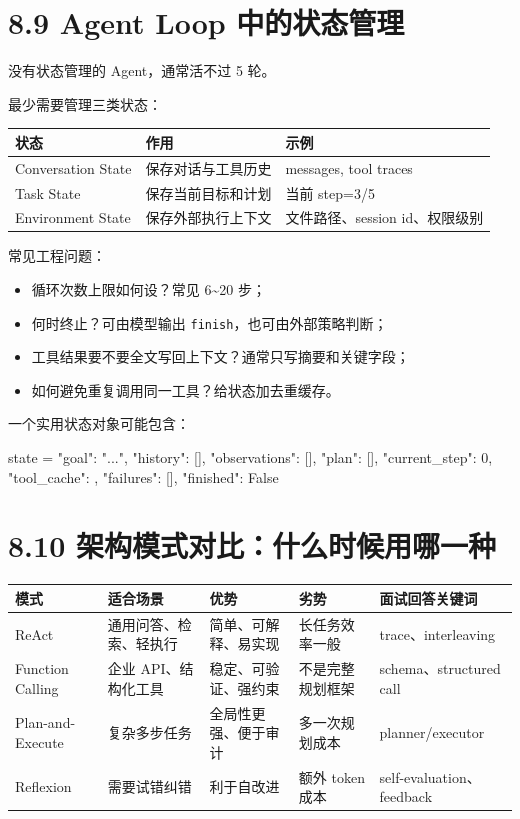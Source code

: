 \section{8.9 Agent Loop 中的状态管理}

没有状态管理的 Agent，通常活不过 5 轮。


最少需要管理三类状态：


\begingroup
\scriptsize
\setlength{\tabcolsep}{3pt}
\begin{longtable}{|p{}|p{}|p{}|}
\hline
状态 & 作用 & 示例 \\ \hline
Conversation State & 保存对话与工具历史 & messages, tool traces \\ \hline
Task State & 保存当前目标和计划 & 当前 step=3/5 \\ \hline
Environment State & 保存外部执行上下文 & 文件路径、session id、权限级别 \\ \hline
\end{longtable}
\endgroup

常见工程问题：


\begin{itemize}[leftmargin=2em]
\item 循环次数上限如何设？常见 6\textasciitilde{}20 步；
\item 何时终止？可由模型输出 \texttt{finish}，也可由外部策略判断；
\item 工具结果要不要全文写回上下文？通常只写摘要和关键字段；
\item 如何避免重复调用同一工具？给状态加去重缓存。
\end{itemize}

一个实用状态对象可能包含：


\begin{codeblock}
state = {
    "goal": "...",
    "history": [],
    "observations": [],
    "plan": [],
    "current_step": 0,
    "tool_cache": {},
    "failures": [],
    "finished": False
}
\end{codeblock}

\section{8.10 架构模式对比：什么时候用哪一种}

\begingroup
\scriptsize
\setlength{\tabcolsep}{3pt}
\begin{longtable}{|p{}|p{}|p{}|p{}|p{}|}
\hline
模式 & 适合场景 & 优势 & 劣势 & 面试回答关键词 \\ \hline
ReAct & 通用问答、检索、轻执行 & 简单、可解释、易实现 & 长任务效率一般 & trace、interleaving \\ \hline
Function Calling & 企业 API、结构化工具 & 稳定、可验证、强约束 & 不是完整规划框架 & schema、structured call \\ \hline
Plan-and-Execute & 复杂多步任务 & 全局性更强、便于审计 & 多一次规划成本 & planner/executor \\ \hline
Reflexion & 需要试错纠错 & 利于自改进 & 额外 token 成本 & self-evaluation、feedback \\ \hline
\end{longtable}
\endgroup

